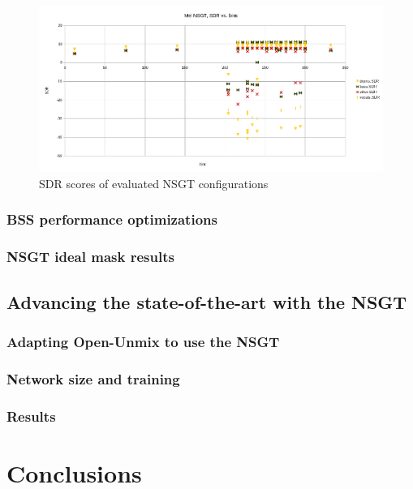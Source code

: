\documentclass[letter,12pt,notitlepage]{article}
\begin{document}
\begin{figure}[ht]
	\centering
	\includegraphics[width=16cm]{./mel_nsgt_params.png}
	\caption{SDR scores of evaluated NSGT configurations}
	\label{fig:melnsgt}
\end{figure}

\subsubsection{BSS performance optimizations}

\subsubsection{NSGT ideal mask results}

\subsection{Advancing the state-of-the-art with the NSGT}


\subsubsection{Adapting Open-Unmix to use the NSGT}

\subsubsection{Network size and training}

\subsubsection{Results}

\vfill
\clearpage

\section{Conclusions}
\label{sec:conclusion}
\end{document}
